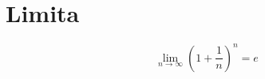 \chapter{Limita}
\vfill{}
{\Huge \color{gray}
\begin{equation*}
\lim_{n \rightarrow \infty} \left( 1 + \frac{1}{n}  \right)^n = e
\end{equation*}
}